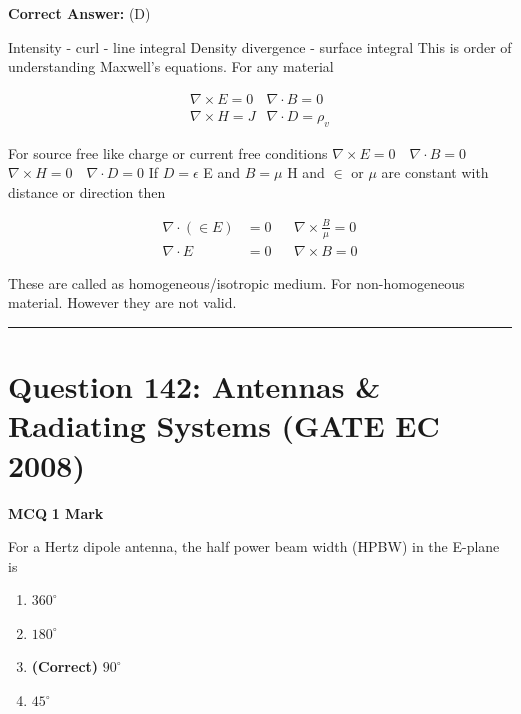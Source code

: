 \documentclass[11pt,a4paper]{article}
\begin{document}
\noindent \textbf{Correct Answer:} (D)

\begin{tcolorbox}[solbox, title=Detailed Solution -- Question 141]
Intensity - curl - line integral 
 Density divergence - surface integral
 This is order of understanding Maxwell's equations. 
 For any material

\[
\begin{array}{cc} \nabla \times E=0 & \nabla \cdot B=0 \\ \nabla \times H=J & \nabla \cdot D=\rho_{v} \end{array}
\]

 For source free like charge or current free conditions
$\nabla \times E=0 \quad \nabla \cdot B=0$
$\nabla \times H=0 \quad \nabla \cdot D=0$
 If $D=\epsilon$ E and $B=\mu$ H and $\in$ or $\mu$ are constant with  distance or direction then

\[
\begin{aligned} \nabla \cdot(\in E) &=0 & & \nabla \times \frac{B}{\mu}=0 \\ \nabla \cdot E &=0 & & \nabla \times B=0 \end{aligned}
\]

 These are called as homogeneous/isotropic medium. 
 For non-homogeneous material. However they are not valid.
\end{tcolorbox}

\vspace{1.5em}
\hrule
\vspace{1.5em}

\section*{Question 142: Antennas \& Radiating Systems (GATE EC 2008)}
\noindent \textbf{\color{primary}MCQ} \hfill \textbf{\color{secondary}1 Mark}


\noindent For a Hertz dipole antenna, the half power beam width (HPBW) in the E-plane is


\begin{enumerate}[label=(\Alph*)]
    \item $360^{\circ}$
    \item $180^{\circ}$
    \item \textbf{(Correct)} $90^{\circ}$
    \item $45^{\circ}$
\end{enumerate}
\end{document}
